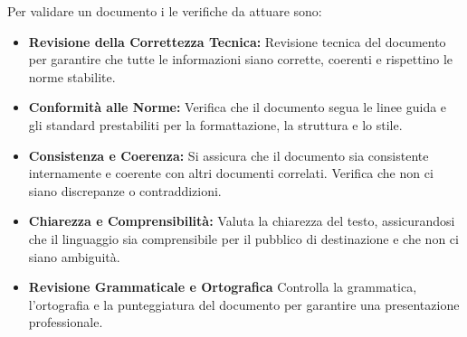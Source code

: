 \documentclass{article}
\begin{document}
\vspace{0.3cm}

Per validare un documento i le verifiche da attuare sono:
\begin{itemize}
    \item \textbf{Revisione della Correttezza Tecnica:} Revisione tecnica del documento per garantire che tutte le informazioni siano corrette, coerenti e rispettino le norme stabilite.
     \item \textbf{Conformità alle Norme:} Verifica che il documento segua le linee guida e gli standard prestabiliti per la formattazione, la struttura e lo stile.
      \item \textbf{Consistenza e Coerenza:} Si assicura che il documento sia consistente internamente e coerente con altri documenti correlati. Verifica che non ci siano discrepanze o contraddizioni.
      \item \textbf{Chiarezza e Comprensibilità:} Valuta la chiarezza del testo, assicurandosi che il linguaggio sia comprensibile per il pubblico di destinazione e che non ci siano ambiguità.
      \item \textbf{Revisione Grammaticale e Ortografica} Controlla la grammatica, l'ortografia e la punteggiatura del documento per garantire una presentazione professionale.
\end{itemize}
\end{document}
